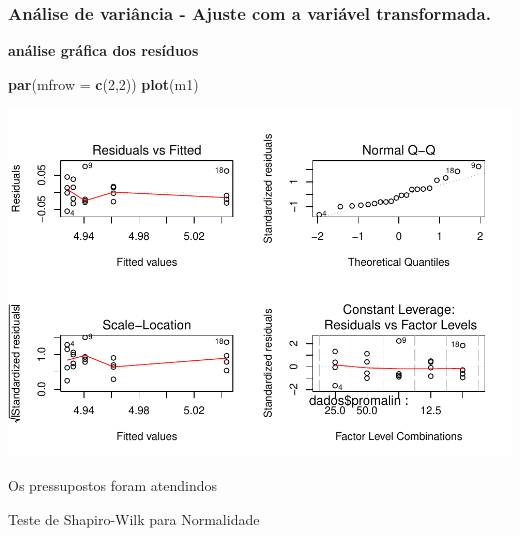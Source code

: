 \documentclass[
]{book}
\newenvironment{Shaded}{\begin{snugshade}}{\end{snugshade}}
\newcommand{\DataTypeTok}[1]{\textcolor[rgb]{0.13,0.29,0.53}{#1}}
\newcommand{\DecValTok}[1]{\textcolor[rgb]{0.00,0.00,0.81}{#1}}
\newcommand{\FloatTok}[1]{\textcolor[rgb]{0.00,0.00,0.81}{#1}}
\newcommand{\KeywordTok}[1]{\textcolor[rgb]{0.13,0.29,0.53}{\textbf{#1}}}
\newcommand{\NormalTok}[1]{#1}
\newcommand{\OperatorTok}[1]{\textcolor[rgb]{0.81,0.36,0.00}{\textbf{#1}}}
\newcommand{\StringTok}[1]{\textcolor[rgb]{0.31,0.60,0.02}{#1}}
\begin{document}
\hypertarget{anuxe1lise-de-variuxe2ncia---ajuste-com-a-variuxe1vel-transformada.}{%
\subsubsection{Análise de variância - Ajuste com a variável transformada.}\label{anuxe1lise-de-variuxe2ncia---ajuste-com-a-variuxe1vel-transformada.}}

\begin{Shaded}
\end{Shaded}

\textbf{análise gráfica dos resíduos}

\begin{Shaded}
\begin{Highlighting}[]
\KeywordTok{par}\NormalTok{(}\DataTypeTok{mfrow =} \KeywordTok{c}\NormalTok{(}\DecValTok{2}\NormalTok{,}\DecValTok{2}\NormalTok{))}
\KeywordTok{plot}\NormalTok{(m1)}
\end{Highlighting}
\end{Shaded}

\includegraphics{TudodoR_files/figure-latex/unnamed-chunk-294-1.pdf}

Os pressupostos foram atendindos

Teste de Shapiro-Wilk para Normalidade

\begin{Shaded}
\end{Shaded}
\end{document}
